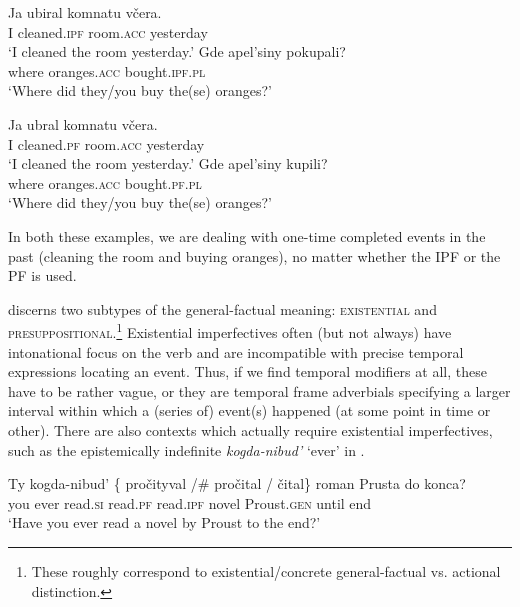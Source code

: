 \documentclass[output=paper,modfonts,newtxmath,hidelinks
]{langscibook}
\begin{document}
\ea\label{oranges}
\ea\gll Ja ubiral komnatu včera.\\
       I cleaned.\textsc{ipf} room.\textsc{acc} yesterday\\
\glt       `I cleaned the room yesterday.'
\ex\gll Gde apel'siny pokupali?\\
               where oranges.\textsc{acc} bought.\textsc{ipf}.\textsc{pl} \\
\glt               `Where did they/you buy the(se) oranges?'
\z\z

\ea\label{orangesPF}
\ea\gll Ja ubral komnatu včera.\\
       I cleaned.\textsc{pf} room.\textsc{acc} yesterday\\
\glt       `I cleaned the room yesterday.'
\ex\gll Gde apel'siny kupili?\\
     where oranges.\textsc{acc} bought.\textsc{pf}.\textsc{pl}\\
\glt               `Where did they/you buy the(se) oranges?'
\z\z

\noindent In both these examples, we are dealing with one-time completed events in the past (cleaning the room and buying oranges), no matter whether the IPF or the PF is used.

\citet{gronndiss} discerns two subtypes of the general-factual meaning: \textsc{existential} and \textsc{presuppositional}.\footnote{These roughly correspond to  existential/concrete general-factual vs. actional distinction.} Existential imperfectives often (but not always) have intonational focus on the verb and are incompatible with precise temporal expressions locating an event. Thus, if we find temporal modifiers at all, these have to be rather vague, or they are temporal frame adverbials specifying a larger interval within which a (series of) event(s) happened (at some point in time or other). There are also contexts which actually require existential imperfectives, such as the epistemically indefinite \textit{kogda-nibud'} `ever' in .

\ea\gll Ty kogda-nibud' \{\hspace{-2pt} pročityval /\#\hspace{-2pt} pročital / čital\} roman Prusta do konca? \\
you ever {} read.\textsc{si} {} read.\textsc{pf} {} read.\textsc{ipf} novel Proust.\textsc{gen} until end\\
\glt `Have you ever read a novel by Proust to the end?' \hfill \citep[][73]{gronndiss}\label{Proust}
\z
\end{document}
